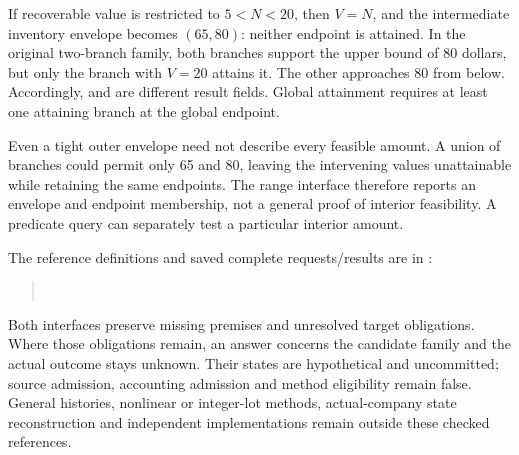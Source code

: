 If recoverable value is restricted to \(5<N<20\), then \(V=N\), and the
intermediate inventory envelope becomes \((65,80)\): neither endpoint is
attained. In the original two-branch family, both branches support the upper
bound of 80 dollars, but only the branch with \(V=20\) attains it. The other approaches 80
from below. Accordingly,  and
 are different result fields. Global attainment
requires at least one attaining branch at the global endpoint.

Even a tight outer envelope need not describe every feasible amount. A union
of branches could permit only 65 and 80, leaving the intervening values
unattainable while retaining the same endpoints. The range interface therefore
reports an envelope and endpoint membership, not a general proof of interior
feasibility. A predicate query can separately test a particular interior amount.

The reference definitions and saved complete requests/results are in
:
\begin{quote}\small
{}\\
\end{quote}
Both interfaces preserve missing premises and unresolved target obligations.
Where those obligations remain, an answer concerns the candidate family and
the actual outcome stays unknown. Their states are hypothetical and uncommitted;
source admission, accounting admission and method eligibility remain false.
General histories, nonlinear or integer-lot methods, actual-company state
reconstruction and independent implementations remain outside these checked
references.








